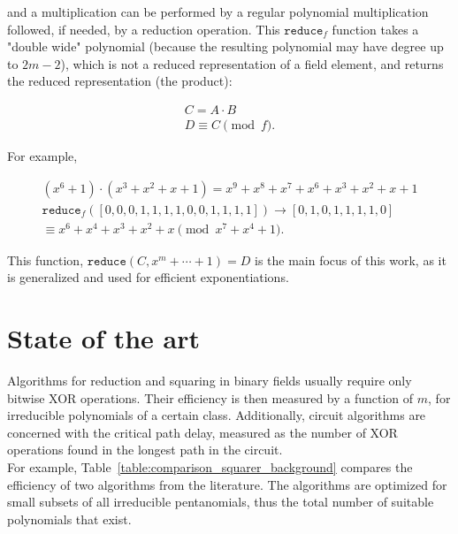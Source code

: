 \noindent and a multiplication can be performed by a regular polynomial multiplication followed, if needed, by a reduction operation. This $\texttt{reduce}_f$ function takes a "double wide" polynomial (because the resulting polynomial may have degree up to $2m-2$), which is not a reduced representation of a field element, and returns the reduced representation (the product):

\begin{gather*}
C = A \cdot B\\
D \equiv C \pmod f .
\end{gather*}

For example,

\begin{gather*}
(x^6+1) \cdot (x^3+x^2+x+1) = x^9 + x^8 + x^7 + x^6 + x^3 + x^2 + x + 1 \\
\texttt{reduce}_f([0, 0, 0, 1, 1, 1, 1, 0, 0, 1, 1, 1, 1]) \rightarrow [0, 1, 0, 1, 1, 1, 1, 0]\\
\equiv x^6 + x^4 + x^3 + x^2 + x \pmod{x^7+x^4+1}.
\end{gather*}

This function, $\texttt{reduce}(C, x^m+ \cdots +1) = D$ is the main focus of this work, as it is generalized and used for efficient exponentiations.


\section{State of the art} \label{stateoftheart}

Algorithms for reduction and squaring in binary fields usually require only bitwise XOR operations. Their efficiency is then measured by a function of $m$, for irreducible polynomials of a certain class. Additionally, circuit algorithms are concerned with the critical path delay, measured as the number of XOR operations found in the longest path in the circuit. \\

For example, Table~\ref{table:comparison_squarer_background} compares the efficiency of two algorithms from the literature. The algorithms are optimized for small subsets of all irreducible pentanomials, thus the total number of suitable polynomials that exist. \\

